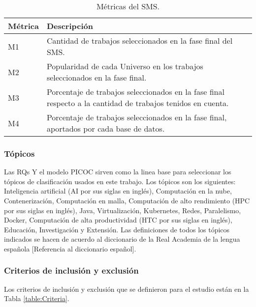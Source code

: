 \begin{table}[htbp]
	
	\centering
	\renewcommand{\arraystretch}{1.7}  %
	\setlength{\tabcolsep}{3pt}      %
	\vspace{10pt}                     %
	\begin{tabular}{|>{\arraybackslash}m{1cm}|>{\arraybackslash}m{7cm}|}
		\hline	
		\textbf{Métrica} & \textbf{Descripción} \\
		\hline
		M1 & Cantidad de trabajos seleccionados en la fase final del SMS.\\
		\hline
		M2 & Popularidad de cada Universo en los trabajos seleccionados en la fase final.\\
		\hline
		M3 & Porcentaje de trabajos seleccionados en la fase final respecto a la cantidad de trabajos tenidos en cuenta.\\
		\hline
		M4 & Porcentaje de trabajos seleccionados en la fase final, aportados por cada base de datos.\\
		\hline
	\end{tabular}
	\vspace{6pt}  %
	\caption{Métricas del SMS.}
	\label{table:Metrics}
	
\end{table}

\subsubsection{Tópicos}
Las RQs Y el modelo PICOC sirven como la linea base para seleccionar los tópicos de clasificación usados en este trabajo. Los tópicos son los siguientes: Inteligencia artificial (AI por sus siglas en inglés), Computación en la nube, Contenerización, Computación en malla, Computación de alto rendimiento (HPC por sus siglas en inglés), Java, Virtualización, Kubernetes, Redes, Paralelismo, Docker, Computación de alta productividad (HTC por sus siglas en inglés), Educación, Investigación y Extensión. Las definiciones de todos los tópicos indicados se hacen de acuerdo al diccionario de la Real Academia de la lengua española [Referencia al diccionario español].

\subsubsection{Criterios de inclusión y exclusión}
Los criterios de inclusión y exclusión que se definieron para el estudio están en la Tabla \ref{table:Criteria}.

